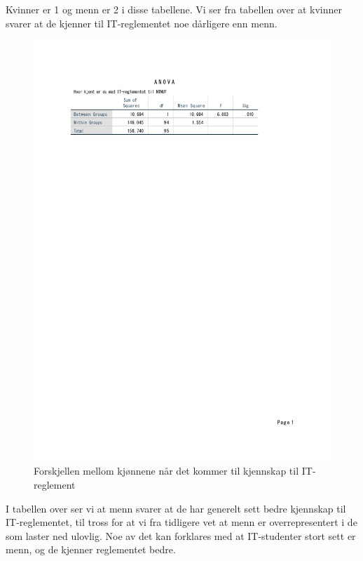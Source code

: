 Kvinner er 1 og menn er 2 i disse tabellene. Vi ser fra tabellen over at kvinner svarer at de kjenner til IT-reglementet noe dårligere enn menn. 
\begin{figure}[H]
    \centering
    \includegraphics[scale=0.7]{case_1/bilder/kjonn_kjent_anova.pdf}
    \caption[Forskjell mellom kjønn på kjennskap til IT-reglement]{Forskjellen mellom kjønnene når det kommer til kjennskap til IT-reglement}
    \label{fig:fakultet_pastander_anova}
\end{figure}

I tabellen over ser vi at menn svarer at de har generelt sett bedre kjennskap til IT-reglementet, til tross for at vi fra tidligere vet at menn er overrepresentert i de som laster ned ulovlig. Noe av det kan forklares med at IT-studenter stort sett er menn, og de kjenner reglementet bedre.


